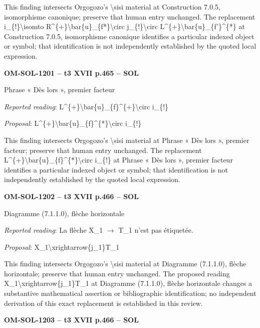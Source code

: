 This finding intersects Orgogozo's \textbackslash{}sisi material at Construction 7.0.5, isomorphisme canonique; preserve that human entry unchanged. The replacement i\_\{!\}\textbackslash{}isomto R\textasciicircum{}\{+\}\textbackslash{}bar\{u\}\_\{f*\}\textbackslash{}circ j\_\{!\}\textbackslash{}circ L\textasciicircum{}\{+\}\textbackslash{}bar\{u\}\_\{f'\}\textasciicircum{}\{*\} at Construction 7.0.5, isomorphisme canonique identifies a particular indexed object or symbol; that identification is not independently established by the quoted local expression.\par
\par\noindent\textbf{OM-SOL-1201 -- t3 XVII p.465 -- SOL}\par
Phrase « Dès lors », premier facteur\par
\emph{Reported reading}: L\textasciicircum{}\{+\}\textbackslash{}bar\{u\}\_\{f\}\textasciicircum{}\{+\}\textbackslash{}circ i\_\{!\}\par
\emph{Proposal}: L\textasciicircum{}\{+\}\textbackslash{}bar\{u\}\_\{f\}\textasciicircum{}\{*\}\textbackslash{}circ i\_\{!\}\par
This finding intersects Orgogozo's \textbackslash{}sisi material at Phrase « Dès lors », premier facteur; preserve that human entry unchanged. The replacement L\textasciicircum{}\{+\}\textbackslash{}bar\{u\}\_\{f\}\textasciicircum{}\{*\}\textbackslash{}circ i\_\{!\} at Phrase « Dès lors », premier facteur identifies a particular indexed object or symbol; that identification is not independently established by the quoted local expression.\par
\par\noindent\textbf{OM-SOL-1202 -- t3 XVII p.466 -- SOL}\par
Diagramme (7.1.1.0), flèche horizontale\par
\emph{Reported reading}: La flèche X\_1 \ensuremath{\to} T\_1 n'est pas étiquetée.\par
\emph{Proposal}: X\_1\textbackslash{}xrightarrow\{j\_1\}T\_1\par
This finding intersects Orgogozo's \textbackslash{}sisi material at Diagramme (7.1.1.0), flèche horizontale; preserve that human entry unchanged. The proposed reading X\_1\textbackslash{}xrightarrow\{j\_1\}T\_1 at Diagramme (7.1.1.0), flèche horizontale changes a substantive mathematical assertion or bibliographic identification; no independent derivation of this exact replacement is established in this review.\par
\par\noindent\textbf{OM-SOL-1203 -- t3 XVII p.466 -- SOL}\par
